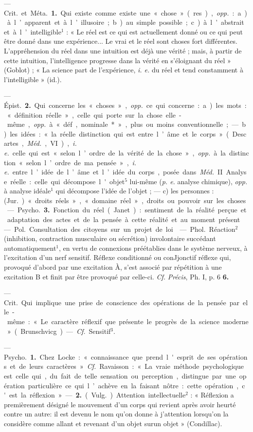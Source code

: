 \begin{itemize}[leftmargin=1cm, label=, itemsep=1pt]
 — \si{Crit.} et \si{Méta.} {\bf 1.} Qui existe
comme existe une « chose » (res),
{\it opp.} : a) à l’apparent et à l’illusoire;
b) au simple possible; c) à l’abstrait
et à l’intelligible$^1$ : « Le réel est ce
qui est actuellement donné ou ce
qui peut être donné dans une expérience... Le vrai et le réel sont choses
fort différentes. L’appréhension du
réel dans une intuition est déjà une
vérité ; mais, à partir de cette intuition, l'intelligence progresse dans la
vérité en s’éloignant du réel »
(Goblot) ; « La science part de l’expérience, {\it i. e.} du réel et tend constamment à l'intelligible » (id.).

— \si{Épist.} {\bf 2.} Qui concerne les
« choses », {\it opp.} ce qui concerne :
a) les mots : « définition réelle », celle
qui porte sur la chose elle-même,
{\it opp.} à « déf, nominale* », plus ou
moins conventionnelle ; — b) les
idées : « la réelle distinction qui est
entre l’âme et le corps » (Descartes,
\si{{\it Méd.}}, VI), {\it i. e.} celle qui est « selon
l’ordre de la vérité de la chose »,
{\it opp.} à la distinction « selon l’ordre
de ma pensée », {\it i. e.} entre l’idée de
l’âme et l’idée du corps, posée dans
\si{{\it Méd.}} II. Analyse réelle : celle qui
décompose l'objet$^5$ lui-même ({\it p. e.}
analyse chimique), {\it opp.} à analyse
idéale$^1$ qui décompose l'idée de
l’objet ; — c) les personnes : (\si{Jur.})
« droits réels », « domaine réel »,
droits ou pouvoir sur les choses.

— \si{Psycho.} {\bf 3.} Fonction du réel
(Janet) : sentiment de la réalité
perçue et adaptation des actes et
de la pensée à cette réalité et au
moment présent.

 — \si{Pol.} Consultation des
citoyens sur un projet de loi.

 — \si{Phol.} Réaction$^2$ (inhibition, contraction musculaire ou sécrétion) involontaire succédant automatiquement$^1$, en vertu de connexions préétablies dans le système
nerveux, à l'excitation d’un nerf
sensitif. Réflexe conditionné ou conJjonctif réflexe qui, provoqué
d’abord par une excitation À, s’est
associé par répétition à une excitation B et finit par être provoqué par
celle-ci. {\it Cf.} {\it Précis}, Ph. I, p. 6 {\bf 6.}

 — \si{Crit.} Qui implique une
prise de conscience des opérations de
la pensée par elle-même : « Le caractère réflexif que présente le progrès
de la science moderne » (Brunschvicg). — {\it Cf.} Sensitif$^3$.

 — \si{Psycho.} {\bf 1.} Chez Locke :
« connaissance que prend l'esprit de
ses opérations et de leurs caractères ». {\it Cf.} Ravaisson : « La vraie
méthode psychologique est celle
qui, du fait de telle sensation ou
perception, distingue par une opération particulière ce qui l’achève en
la faisant nôtre : cette opération,
c'est la réflexion. » — {\bf 2.} (\si{Vulg.})
Attention intellectuelle$^2$ : « Réflexion
a premièrement désigné le mouvement d’un corps qui revient après
avoir heurté contre un autre: il est
devenu le nom qu'on donne à j'attention lorsqu'on la considère comme
allant et revenant d’un objet surun
objet » (Condillac).


\end{itemize}
